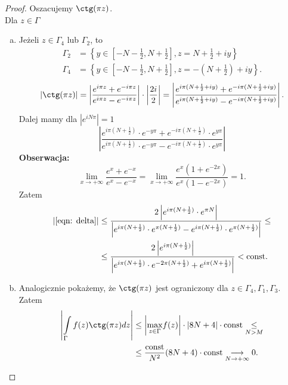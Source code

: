 \documentclass[../main.tex]{subfiles}
\begin{document}
    \pagebreak
    \begin{proof}
        Oszacujemy $\ctg(\pi z)$.\\
        Dla  $z\in \Gamma$
        \begin{enumerate}[a)]
            \item Jeżeli $z\in \Gamma_4$ lub $\Gamma_2$, to
                \begin{align*}
                    \Gamma_2 &= \left\{ y\in \left[ -N - \frac{1}{2}, N + \frac{1}{2} \right] , z = N + \frac{1}{2} + iy \right\}\\
                    \Gamma_4 &= \left\{ y\in \left[ -N - \frac{1}{2}, N + \frac{1}{2} \right] , z = -(N + \frac{1}{2}) + iy \right\}
                .\end{align*}
            \[
                \left| \ctg(\pi z) \right| = \left| \frac{e^{i\pi z} + e^{-i \pi z}}{e^{i \pi z} - e^{- i \pi z}} \right|\cdot \left| \frac{2i}{2} \right| = \left| \frac{e^{i\pi(N + \frac{1}{2} + iy)} + e^{-i\pi(N + \frac{1}{2} + iy)}}{e^{i\pi(N + \frac{1}{2} + iy)} - e^{-i\pi(N + \frac{1}{2} + iy)}} \right|
            .\]
        Dalej mamy dla $\left| e^{iN\pi} \right| = 1$
        \begin{equation}
            \label{eqn: delta}
            \left| \frac{e^{i\pi(N + \frac{1}{2})}\cdot e^{-y\pi} + e^{-i\pi(N + \frac{1}{2})}\cdot e^{y\pi}}{e^{i\pi(N + \frac{1}{2})}\cdot e^{-y\pi} - e^{-i\pi(N + \frac{1}{2})}\cdot e^{y\pi}} \right| \tag{$\Delta$}
        \end{equation}
    \textbf{Obserwacja: }
                \[
                    \lim\limits_{x\to +\infty} \frac{e^{x} + e^{-x}}{e^{x} - e^{-x}} = \lim\limits_{x\to + \infty} \frac{e^x(1+e^{-2x})}{e^{x}(1-e^{-2x})} = 1
                .\]
            Zatem
            \begin{align*}
                \left|\eqref{eqn: delta}\right| &\le \frac{2\left| e^{i\pi(N + \frac{1}{2})}\cdot e^{\pi N} \right|}{\left| e^{i\pi(N + \frac{1}{2})} \cdot e^{\pi(N+\frac{1}{2})} - e^{i \pi(N + \frac{1}{2})}\cdot e^{\pi(N + \frac{1}{2})} \right| } \le\\
                &\le \frac{2 \left| e^{i\pi(N + \frac{1}{2})} \right|}{\left| e^{i \pi(N + \frac{1}{2})} \cdot e^{-2\pi(N + \frac{1}{2})} + e^{i\pi(N + \frac{1}{2})} \right| } < \text{const}
            .\end{align*}
    \item Analogicznie pokażemy, że $\ctg(\pi z)$ jest ograniczony dla $z\in \Gamma_4, \Gamma_1, \Gamma_3$. Zatem
        \begin{align*}
            \left| \int\limits_{\Gamma}f(z)\ctg(\pi z)dz \right| &\le \left| \underset{z\in\Gamma}{\max}f(z)  \right| \cdot \left| 8N + 4 \right| \cdot \text{const} \underset{N > M}{\le}\\
                &\le \frac{\text{const}}{N^2} (8N + 4) \cdot \text{const} \underset{N \to + \infty}{\longrightarrow}  0
        .\end{align*}
        \end{enumerate}
    \end{proof}
\end{document}
